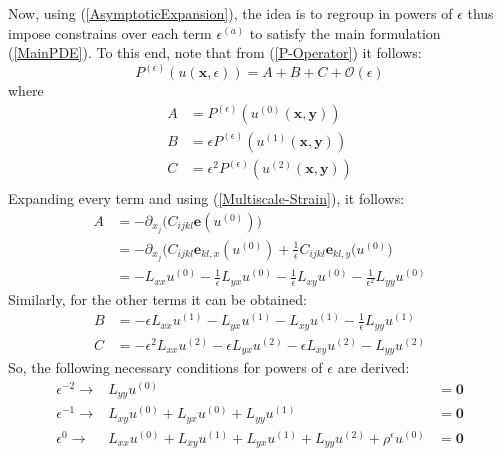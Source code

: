 Now, using (\ref{AsymptoticExpansion}), the idea is to regroup in powers of $\epsilon$ thus impose constrains over each term $\epsilon^{(a)}$ to satisfy the main formulation (\ref{MainPDE}). To this end, note that from (\ref{P-Operator}) it follows:
\begin{equation*}
    P^{(\epsilon)}(u(\mathbf{x},\epsilon)) = A + B + C + \mathcal{O}(\epsilon)
\end{equation*}
where 
\begin{equation*}
    \begin{array}{cc}
        A &= P^{(\epsilon)}(u^{(0)}(\mathbf{x},\mathbf{y})) \\
        B &= \epsilon P^{(\epsilon)}(u^{(1)}(\mathbf{x},\mathbf{y})) \\
        C &= \epsilon^2 P^{(\epsilon)}(u^{(2)}(\mathbf{x},\mathbf{y})) \\
    \end{array}
\end{equation*}
Expanding every term and using (\ref{Multiscale-Strain}), it follows:
\begin{align*}
    A &= - \partial_{x_j} \big( C_{ijkl}\mathbf{e}(u^{(0)}) \big) \\
    &=- \partial_{x_j} \big( C_{ijkl} \mathbf{e}_{kl,x} (u^{(0)}) + \frac{1}{\epsilon}C_{ijkl}\mathbf{e}_{kl,y}(u^{(0)} \big)\\
    &= - L_{xx}u^{(0)} - \frac{1}{\epsilon} L_{yx}u^{(0)} - \frac{1}{\epsilon} L_{xy}u^{(0)} - \frac{1}{\epsilon^2}L_{yy}u^{(0)}
\end{align*}
Similarly, for the other terms it can be obtained:
\begin{align*}
    B &= -\epsilon L_{xx} u^{(1)} - L_{yx}u^{(1)} - L_{xy} u^{(1)} - \frac{1}{\epsilon} L_{yy}u^{(1)} \\
    C &= -\epsilon^2 L_{xx} u^{(2)} - \epsilon L_{yx}u^{(2)} - \epsilon L_{xy} u^{(2)} - L_{yy}u^{(2)} 
\end{align*}
So, the following necessary conditions for powers of $\epsilon$ are derived:
\begin{equation}
    \label{Epsilon-Separation}
    \begin{array}{ccc}
        \epsilon^{-2} \longrightarrow & L_{yy} u^{(0)} &= \mathbf{0} \\
        \epsilon^{-1} \longrightarrow & L_{xy}u^{(0)} + L_{yx} u^{(0)} + L_{yy} u^{(1)} &= \mathbf{0} \\
        \epsilon^{0} \longrightarrow & L_{xx} u^{(0)} + L_{xy} u^{(1)} + L_{yx} u^{(1)} + L_{yy} u^{(2)} + \rho^{\epsilon} u^{(0)} &= \mathbf{0}
    \end{array}
\end{equation}

